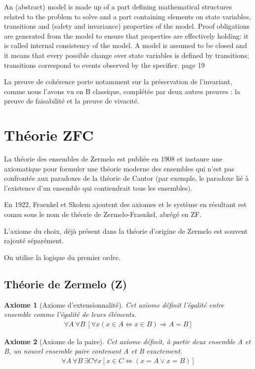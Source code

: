 \documentclass[10pt,a4paper]{article}
\newtheorem{axiom}{Axiome}[section]
\begin{document}
{An (abstract) model is made up of a part defining mathematical structures
related to the problem to solve and a part containing elements on state variables,
transitions and (safety and invariance) properties of the model. Proof obligations
are generated from the model to ensure that properties are effectively holding: it
is called internal consistency of the model. A model is assumed to be closed and
it means that every possible change over state variables is defined by transitions;
transitions correspond to events observed by the specifier.
page 19


La preuve de cohérence porte
notamment sur la préservation de l'invariant, comme nous l’avons
vu en B classique, complétée par deux autres preuves : la preuve
de faisabilité et la preuve de vivacité.\cite{dossierTechnique}
\fi

\appendix

\section{Théorie ZFC}
\label{ZFC}
La théorie des ensembles de Zermelo est publiée en 1908 et instaure une axiomatique pour formuler une théorie moderne des ensembles qui n'est pas confrontée aux paradoxes de la théorie de Cantor (par exemple, le paradoxe lié à l'existence d'un ensemble qui contiendrait tous les ensembles).

En 1922, Fraenkel et Skolem ajoutent des axiomes et le système en résultant est connu sous le nom de théorie de Zermelo-Fraenkel, abrégé en ZF.

L'axiome du choix, déjà présent dans la théorie d'origine de Zermelo est souvent rajouté séparément.

On utilise la logique du premier ordre.

\subsection{Théorie de Zermelo (Z)}

\begin{axiom}[Axiome d'extensionnalité] Cet axiome définit l'égalité entre ensemble comme l'égalité de leurs éléments.
\begin{align}
\forall A\ \forall B \
\left[ 
\forall x \left( x \in A \Leftrightarrow x \in B  \right) \Rightarrow A = B
\right] 
\end{align}
\end{axiom}

\begin{axiom}[Axiome de la paire] Cet axiome définit, à partir deux ensemble A et B, un nouvel ensemble paire contenant A et B exactement.
\begin{align}
\forall A \ \forall B \ \exists C \forall x \left[ x \in C \Leftrightarrow \left( x = A \vee x = B \right) \right]
\end{align}
\end{axiom}

}
\end{document}

